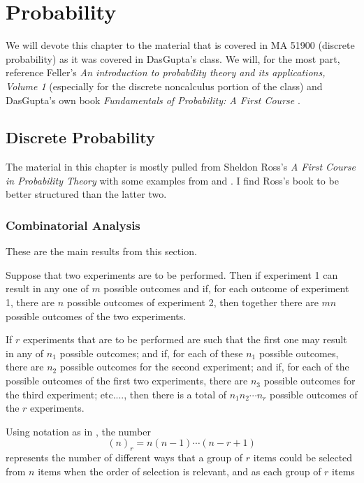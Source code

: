 \chapter{Probability}
We will devote this chapter to the material that is covered in MA 51900
(discrete probability) as it was covered in DasGupta's class. We will, for
the most part, reference Feller's \emph{An introduction to probability
  theory and its applications, Volume 1} \cite{feller} (especially for the
discrete noncalculus portion of the class) and DasGupta's own book
\emph{Fundamentals of Probability: A First Course} \cite{dasgupta}.

\section{Discrete Probability}
The material in this chapter is mostly pulled from Sheldon Ross's \emph{A
  First Course in Probability Theory} with some examples from
\cite{dasgupta} and \cite{feller}. I find Ross's book to be better
structured than the latter two.

\subsection{Combinatorial Analysis}
These are the main results from this section.
\begin{theorem}
  Suppose that two experiments are to be performed. Then if experiment 1
  can result in any one of \(m\) possible outcomes and if, for each outcome
  of experiment 1, there are \(n\) possible outcomes of experiment 2, then
  together there are \(mn\) possible outcomes of the two experiments.
\end{theorem}
\begin{theorem}
  If \(r\) experiments that are to be performed are such that the first one
  may result in any of \(n_1\) possible outcomes; and if, for each of these
  \(n_1\) possible outcomes, there are \(n_2\) possible outcomes for the
  second experiment; and if, for each of the possible outcomes of the first
  two experiments, there are \(n_3\) possible outcomes for the third
  experiment; etc.\@ ..., then there is a total of \(n_1n_2\dotsm n_r\)
  possible outcomes of the \(r\) experiments.
\end{theorem}

Using notation as in \cite{feller}, the number
\[
  (n)_r=n(n-1)\dotsm(n-r+1)
\]
represents the number of different ways that a group of \(r\) items could
be selected from \(n\) items when the order of selection is relevant, and
as each group of \(r\) items

